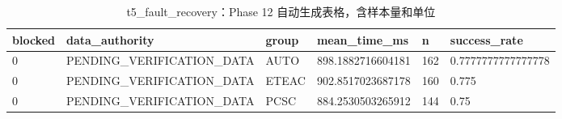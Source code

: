 \begin{table}[htbp]
\centering
\caption{t5_fault_recovery：Phase 12 自动生成表格，含样本量和单位}
\begin{tabular}{llllll}
\hline
blocked & data_authority & group & mean_time_ms & n & success_rate \\
\hline
0 & PENDING\_VERIFICATION\_DATA & AUTO & 898.1882716604181 & 162 & 0.7777777777777778 \\
0 & PENDING\_VERIFICATION\_DATA & ETEAC & 902.8517023687178 & 160 & 0.775 \\
0 & PENDING\_VERIFICATION\_DATA & PCSC & 884.2530503265912 & 144 & 0.75 \\
\hline
\end{tabular}
\end{table}
